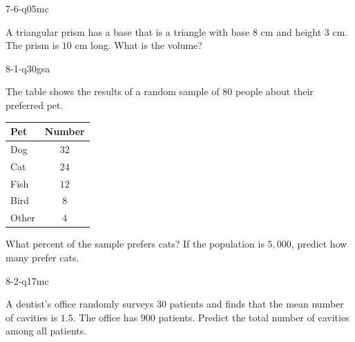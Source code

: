 \begin{practiceQuestion}{7-6-q05}{mc}
\begin{questionText}
A triangular prism has a base that is a triangle with base $8$ cm and height $3$ cm. The prism is $10$ cm long. What is the volume?
\end{questionText}
\end{practiceQuestion}

\begin{practiceQuestion}{8-1-q30}{gsa}
\begin{questionText}
The table shows the results of a random sample of $80$ people about their preferred pet.

\begin{center}
\begin{tabular}{|l|c|}
\hline
\textbf{Pet} & \textbf{Number} \\
\hline
Dog & $32$ \\
\hline
Cat & $24$ \\
\hline
Fish & $12$ \\
\hline
Bird & $8$ \\
\hline
Other & $4$ \\
\hline
\end{tabular}
\end{center}

What percent of the sample prefers cats? If the population is $5{,}000$, predict how many prefer cats.
\end{questionText}
\end{practiceQuestion}

\begin{practiceQuestion}{8-2-q17}{mc}
\begin{questionText}
A dentist's office randomly surveys $30$ patients and finds that the mean number of cavities is $1.5$. The office has $900$ patients. Predict the total number of cavities among all patients.
\end{questionText}
\end{practiceQuestion}

